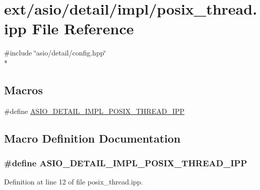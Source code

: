 \hypertarget{posix__thread_8ipp}{}\section{ext/asio/detail/impl/posix\+\_\+thread.ipp File Reference}
\label{posix__thread_8ipp}
{\ttfamily \#include \char`\"{}asio/detail/config.\+hpp\char`\"{}}\\*
\subsection*{Macros}
\begin{DoxyCompactItemize}
\item 
\#define \hyperlink{posix__thread_8ipp_ad255a0d76606bebe1fb5d74b682eadb8}{A\+S\+I\+O\+\_\+\+D\+E\+T\+A\+I\+L\+\_\+\+I\+M\+P\+L\+\_\+\+P\+O\+S\+I\+X\+\_\+\+T\+H\+R\+E\+A\+D\+\_\+\+I\+P\+P}
\end{DoxyCompactItemize}


\subsection{Macro Definition Documentation}
\hypertarget{posix__thread_8ipp_ad255a0d76606bebe1fb5d74b682eadb8}{}
\subsubsection[{A\+S\+I\+O\+\_\+\+D\+E\+T\+A\+I\+L\+\_\+\+I\+M\+P\+L\+\_\+\+P\+O\+S\+I\+X\+\_\+\+T\+H\+R\+E\+A\+D\+\_\+\+I\+P\+P}]{\setlength{\rightskip}{0pt plus 5cm}\#define A\+S\+I\+O\+\_\+\+D\+E\+T\+A\+I\+L\+\_\+\+I\+M\+P\+L\+\_\+\+P\+O\+S\+I\+X\+\_\+\+T\+H\+R\+E\+A\+D\+\_\+\+I\+P\+P}\label{posix__thread_8ipp_ad255a0d76606bebe1fb5d74b682eadb8}


Definition at line 12 of file posix\+\_\+thread.\+ipp.

